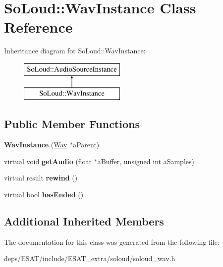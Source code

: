 \hypertarget{class_so_loud_1_1_wav_instance}{}\section{So\+Loud\+:\+:Wav\+Instance Class Reference}
\label{class_so_loud_1_1_wav_instance}
Inheritance diagram for So\+Loud\+:\+:Wav\+Instance\+:\begin{figure}[H]
\begin{center}
\leavevmode
\includegraphics[height=2.000000cm]{class_so_loud_1_1_wav_instance}
\end{center}
\end{figure}
\subsection*{Public Member Functions}
\begin{DoxyCompactItemize}
\item 
\mbox{\label{class_so_loud_1_1_wav_instance_ab647cc457e7203c4831321e5675881a7}} 
{\bfseries Wav\+Instance} (\mbox{\hyperlink{class_so_loud_1_1_wav}{Wav}} $\ast$a\+Parent)
\item 
\mbox{\label{class_so_loud_1_1_wav_instance_a1d138f3fee5b2f82febd5bafc721c016}} 
virtual void {\bfseries get\+Audio} (float $\ast$a\+Buffer, unsigned int a\+Samples)
\item 
\mbox{\label{class_so_loud_1_1_wav_instance_a57c4a74f8321ff60b110aef7f853776b}} 
virtual result {\bfseries rewind} ()
\item 
\mbox{\label{class_so_loud_1_1_wav_instance_ade8f8939a431a779743c8b72e3f10592}} 
virtual bool {\bfseries has\+Ended} ()
\end{DoxyCompactItemize}
\subsection*{Additional Inherited Members}


The documentation for this class was generated from the following file\+:\begin{DoxyCompactItemize}
\item 
deps/\+E\+S\+A\+T/include/\+E\+S\+A\+T\+\_\+extra/soloud/soloud\+\_\+wav.\+h\end{DoxyCompactItemize}
